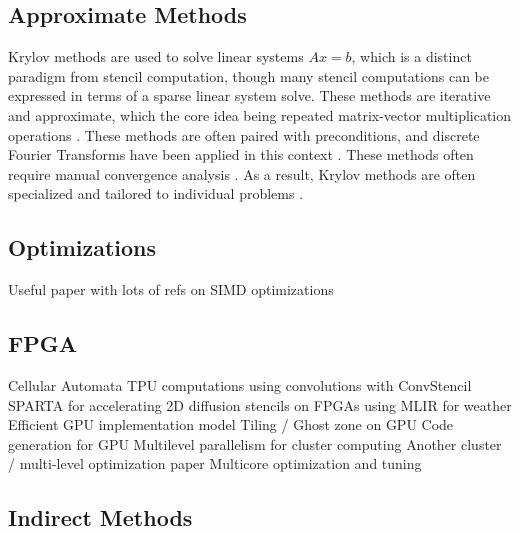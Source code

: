 \subsection{Approximate Methods}
Krylov methods are used to solve linear systems $Ax =b$, which is a distinct paradigm from stencil computation, though many stencil computations can be expressed in terms of a sparse linear system solve.
These methods are iterative and approximate, which the core idea being repeated matrix-vector multiplication operations \cite{Ipsen1998Krylov, Saad1989Krylov}. 
These methods are often paired with preconditions, and discrete Fourier Transforms have been applied in this context \cite{Chan1984fd, Erlangga2006, Gmeiner2013}.
These methods often require manual convergence analysis
\cite{Brown1994Krylov, Kuijlaars2006Krylov, Notay2008Krylov}.
As a result, Krylov methods are often specialized and tailored to individual problems \cite{Asgharzadeh2017Krylov, Ashrafizadeh2015, Garrappa2015Krylov,Mang2015Krylov}.

\subsection{Optimizations}

Useful paper with lots of refs on SIMD optimizations \cite{Henretty2011Stencil} 

\subsection{FPGA}
\begin{outline}
  \1 Cellular Automata \cite{Kyparissas2020Cellular}
  \1 TPU computations using convolutions with ConvStencil \cite{Chen2024ConvStencil}
  \1 SPARTA for accelerating 2D diffusion stencils on FPGAs using MLIR for weather \cite{Singh2023SPARTA}
  \1 Efficient GPU implementation model \cite{Micikevicius2009FDGPU}
  \1 Tiling / Ghost zone on GPU \cite{Meng2009Stencil}
  \1 Code generation for GPU \cite{Holewinski2012Stencil}
  \1 Multilevel parallelism for cluster computing \cite{Dursun2009Stencil}
  \1 Another cluster / multi-level optimization paper \cite{Augustin2009Stencil, Treibig2011Stencil}
  \1 Multicore optimization and tuning \cite{Datta2008Stencil}
  
\end{outline}


\subsection{Indirect Methods}

